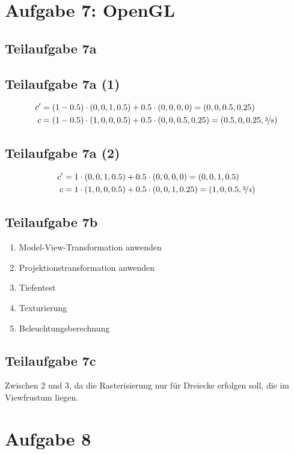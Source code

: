 \documentclass[a4paper]{scrartcl}
\begin{document}
\section*{Aufgabe 7: OpenGL}
\subsection*{Teilaufgabe 7a}
\subsection*{Teilaufgabe 7a (1)}
\begin{align}
    c' &= (1 - 0.5) \cdot (0,0,1,0.5) + 0.5 \cdot (0,0,0,0) = (0,0,0.5,0.25)\\
    c  &= (1 - 0.5) \cdot (1,0,0,0.5) + 0.5 \cdot (0,0,0.5,0.25) = (0.5,0,0.25, \nicefrac{3}{8})
\end{align}

\subsection*{Teilaufgabe 7a (2)}
\begin{align}
    c' &= 1 \cdot (0,0,1,0.5) + 0.5 \cdot (0,0,0,0) = (0,0,1,0.5)\\
    c  &= 1 \cdot (1,0,0,0.5) + 0.5 \cdot (0,0,1,0.25) = (1,0,0.5, \nicefrac{3}{4})
\end{align}

\subsection*{Teilaufgabe 7b}
\begin{enumerate}
    \item Model-View-Transformation anwenden
    \item Projektionstransformation anwenden
    \item Tiefentest
    \item Texturierung
    \item Beleuchtungsberechnung
\end{enumerate}

\subsection*{Teilaufgabe 7c}
Zwischen 2 und 3, da die Rasterisierung nur für Dreiecke erfolgen soll, die
im Viewfrustum liegen.

\section*{Aufgabe 8}
\end{document}
